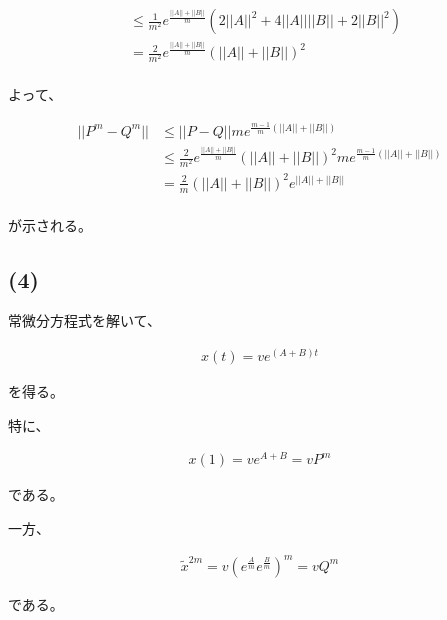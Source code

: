 \documentclass[a4paper, 10pt, dvipdfmx]{jlreq}
\begin{document}
\begin{align*}
          & \leq \frac{1}{m^2}e^{\frac{||A||+||B||}{m}} \left(2||A||^2+4||A||||B||+2||B||^2 \right)                                                                                                                                                                                                            \\
          & = \frac{2}{m^2}e^{\frac{||A||+||B||}{m}} \left(||A||+||B||\right)^2                                                                                                                                                                                                                                \\
\end{align*}

よって、

\begin{align*}
  ||P^m-Q^m|| & \leq ||P-Q||m e^{\frac{m-1}{m}(||A||+||B||)}                                                            \\
              & \leq \frac{2}{m^2}e^{\frac{||A||+||B||}{m}} \left(||A||+||B||\right)^2 m e^{\frac{m-1}{m}(||A||+||B||)} \\
              & = \frac{2}{m} \left(||A||+||B||\right)^2 e^{||A||+||B||}                                                \\
\end{align*}

が示される。

\subsection*{(4)}

常微分方程式を解いて、

\begin{align*}
  x(t)=ve^{(A+B)t}
\end{align*}

を得る。

特に、

\begin{align*}
  x(1)=ve^{A+B}=v P^m
\end{align*}

である。

一方、

\begin{align*}
  \tilde{x}^{2m}=v\left(e^{\frac{A}{m}}e^{\frac{B}{m}}\right)^m=vQ^m
\end{align*}

である。
\end{document}
